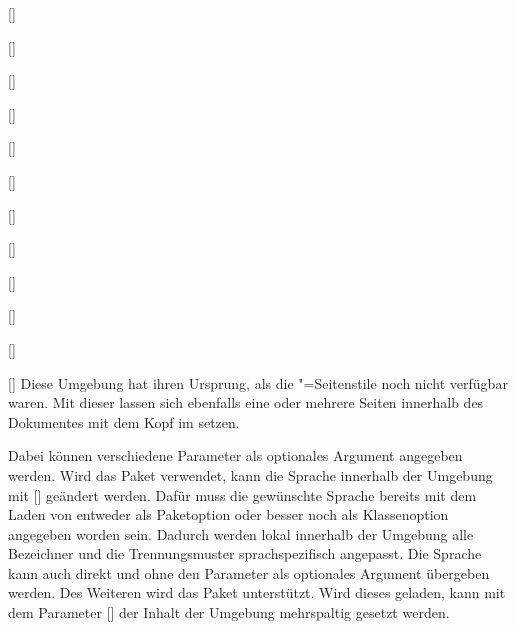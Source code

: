 \begin{Declaration}{[]}
\begin{Declaration}{[]}
\begin{Declaration}{[]}
\begin{Declaration}{[]}
\begin{Declaration}[v2.02]{[\PSet]}
\begin{Declaration}{[]}
\begin{Declaration}[v2.02]{[\PSet]}
\begin{Declaration}[v2.02]{[\PSet]}
\begin{Declaration}[v2.02]{[\PSet]}
\begin{Declaration}{[\PSet]}
\begin{Declaration}[v2.02]{[\PSet]}
\begin{Declaration}{[\PBoolean]}
\printdeclarationlist%
%
%
%
%
Diese Umgebung hat ihren Ursprung, als die "=Seitenstile 
noch nicht verfügbar waren. Mit dieser lassen sich ebenfalls eine oder mehrere 
Seiten innerhalb des Dokumentes mit dem Kopf im \CD setzen. 

Dabei können verschiedene Parameter als optionales Argument angegeben werden. 
Wird das Paket  verwendet, kann die Sprache innerhalb der 
Umgebung mit [] geändert 
werden. Dafür muss die gewünschte Sprache bereits mit dem Laden von 
 entweder als Paketoption oder besser noch als Klassenoption 
angegeben worden sein. Dadurch werden lokal innerhalb der Umgebung alle 
Bezeichner und die Trennungsmuster sprachspezifisch angepasst. Die Sprache kann 
auch direkt und ohne den Parameter  als 
optionales Argument übergeben werden. Des Weiteren wird das Paket 
 unterstützt. Wird dieses geladen, kann mit dem Parameter 
[] der Inhalt der Umgebung 
mehrspaltig gesetzt werden.


\end{Declaration}
\end{Declaration}
\end{Declaration}
\end{Declaration}
\end{Declaration}
\end{Declaration}
\end{Declaration}
\end{Declaration}
\end{Declaration}
\end{Declaration}
\end{Declaration}
\end{Declaration}
